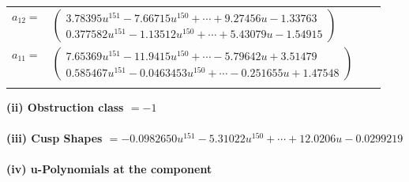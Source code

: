 \documentclass[1p]{elsarticle_modified}
\theoremstyle{definition}
\begin{document}
\begin{tabular}{m{7pt} m{180pt} m{7pt} m{180pt} }
\flushright $a_{12}=$&$\begin{pmatrix}3.78395 u^{151}-7.66715 u^{150}+\cdots+9.27456 u-1.33763\\0.377582 u^{151}-1.13512 u^{150}+\cdots+5.43079 u-1.54915\end{pmatrix}$ \\
\flushright $a_{11}=$&$\begin{pmatrix}7.65369 u^{151}-11.9415 u^{150}+\cdots-5.79642 u+3.51479\\0.585467 u^{151}-0.0463453 u^{150}+\cdots-0.251655 u+1.47548\end{pmatrix}$\\&\end{tabular}
\flushleft \textbf{(ii) Obstruction class $= -1$}\\~\\
\flushleft \textbf{(iii) Cusp Shapes $= -0.0982650 u^{151}-5.31022 u^{150}+\cdots+12.0206 u-0.0299219$}\\~\\
\newpage\renewcommand{\arraystretch}{1}
\flushleft \textbf{(iv) u-Polynomials at the component}\newline \\
\end{document}
